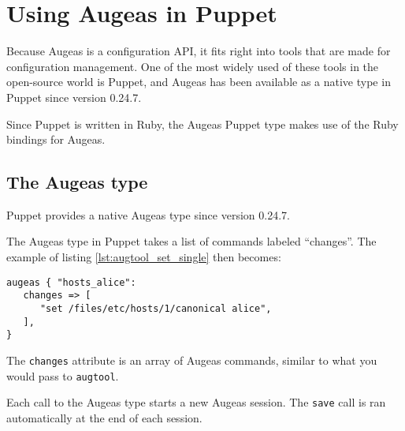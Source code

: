 \chapter{Using Augeas in Puppet}


Because Augeas is a configuration API, it fits right into tools that are made for configuration management. One of the most widely used of these tools in the open-source world is Puppet, and Augeas has been available as a native type in Puppet since version 0.24.7.

Since Puppet is written in Ruby, the Augeas Puppet type makes use of the Ruby bindings for Augeas.

\section{The Augeas type}

Puppet provides a native Augeas type since version 0.24.7.

 The Augeas type in Puppet takes a list of commands labeled ``changes''. The example of listing \ref{lst:augtool_set_single} then becomes:

\begin{verbatim}
augeas { "hosts_alice":
   changes => [
      "set /files/etc/hosts/1/canonical alice",
   ],
}
\end{verbatim}

The \verb!changes! attribute is an array of Augeas commands, similar to what you would pass to \verb!augtool!.

\begin{quote}

\end{quote}
 Each call to the Augeas type starts a new Augeas session. The \verb!save! call is ran automatically at the end of each session.


